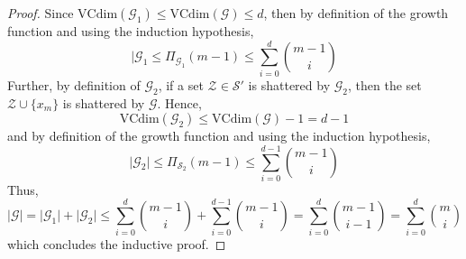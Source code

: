 \begin{proof}
    Since $\mathrm{VCdim}(\mathcal{G}_{1})\leq \mathrm{VCdim}(\mathcal{G})\leq d$, then by definition of the growth function and using the induction hypothesis, 
    \begin{equation}
        \lvert \mathcal{G}_{1} \leq \Pi_{\mathcal{G}_{1}}(m-1) \leq \sum^{d}_{i=0} {m-1 \choose i}
    \end{equation}
    Further, by definition of $\mathcal{G}_{2}$, if a set $\mathcal{Z}\in \mathcal{S}'$ is shattered by $\mathcal{G}_{2}$, then the set $\mathcal{Z}\cup\{x_m\}$ is shattered by $\mathcal{G}$. Hence, 
    \begin{equation}
        \mathrm{VCdim}(\mathcal{G}_{2}) \leq \mathrm{VCdim}(\mathcal{G}) -1 = d-1
    \end{equation}
    and by definition of the growth function and using the induction hypothesis, 
    \begin{equation}
        \lvert \mathcal{G}_{2} \rvert \leq \Pi_{\mathcal{S}_{2}} (m-1) \leq \sum^{d-1}_{i=0} {m-1 \choose i}
    \end{equation}
    Thus, 
    \begin{equation}
        \lvert\mathcal{G}\rvert = \lvert\mathcal{G}_{1}\rvert + \lvert\mathcal{G}_{2}\rvert \leq \sum^{d}_{i=0} {m-1\choose i} + \sum^{d-1}_{i=0} {m-1\choose i} = \sum^{d}_{i=0} {m-1\choose i-1} = \sum^{d}_{i=0} {m\choose i}
    \end{equation}
    which concludes the inductive proof. 
\end{proof}
